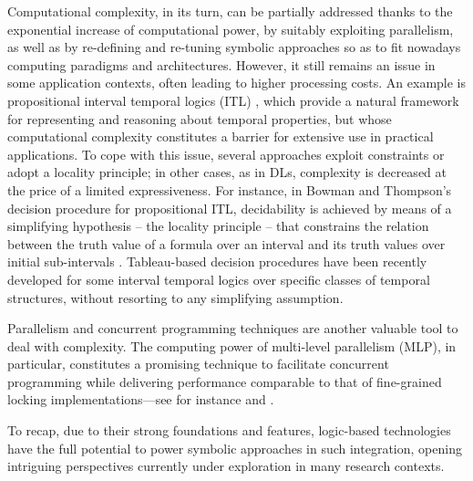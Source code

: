 \documentclass[12pt,a4paper,openright,twoside]{book}
\begin{document}
Computational complexity, in its turn, can be partially addressed thanks to the exponential increase of computational power, by suitably exploiting  parallelism, as well as by re-defining and re-tuning symbolic approaches so as to fit nowadays computing paradigms and architectures.
%
However, it still remains an issue in some application contexts, often leading to higher processing costs.
%
An example is propositional interval temporal logics (ITL) \cite{goranko2004}, which provide a natural framework for representing and reasoning about temporal properties, but whose computational complexity constitutes a barrier for extensive use in practical applications.
%
To cope with this issue, several approaches exploit constraints or adopt a locality principle; in other cases, as in DLs, complexity is decreased at the price of a limited expressiveness.
%
For instance, in Bowman and Thompson’s decision procedure for propositional ITL, decidability is achieved by means of a simplifying hypothesis -- the locality principle -- that constrains the relation between the truth value of a formula over an interval and its truth values over initial sub-intervals \cite{holldobler2008}.
%
Tableau-based decision procedures have been recently developed \cite{dellaMonica2013} for some interval temporal logics over specific classes of temporal structures, without resorting to any simplifying assumption.

Parallelism and concurrent programming techniques are another valuable tool to deal with complexity.
%
The computing power of multi-level parallelism (MLP), in particular, constitutes a promising technique to facilitate concurrent programming while delivering performance comparable to that of fine-grained locking implementations---see for instance \cite{larus2007} and \cite{jacobsen2013}.

To recap, due to their strong foundations and features, logic-based technologies have the full potential to power symbolic approaches in such integration, opening intriguing perspectives currently under exploration in many research contexts.
%
\end{document}
